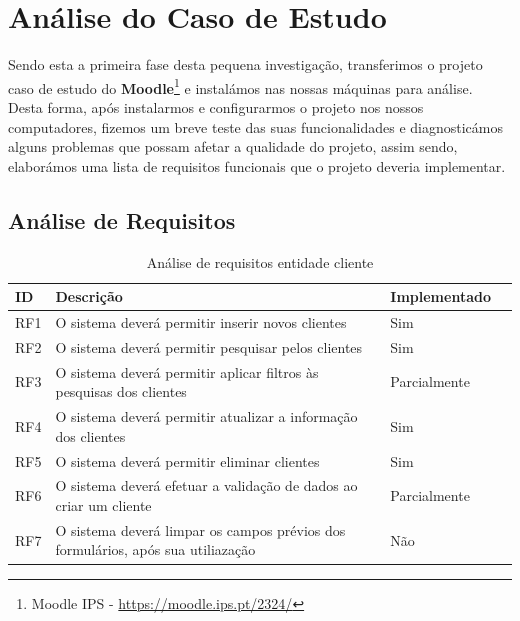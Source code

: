 \documentclass[a4paper,12pt]{article} %
\begin{document}
\newpage
\section{Análise do Caso de Estudo}
Sendo esta a primeira fase desta pequena investigação, transferimos o projeto caso de estudo do \textbf{Moodle}\footnote{Moodle IPS - \url{https://moodle.ips.pt/2324/}} e instalámos nas nossas máquinas para análise. Desta forma, após instalarmos e configurarmos o projeto nos nossos computadores, fizemos um breve teste das suas funcionalidades e diagnosticámos alguns problemas que possam afetar a qualidade do projeto, assim sendo, elaborámos uma lista de requisitos funcionais que o projeto deveria implementar.

\subsection{Análise de Requisitos}
\begin{table}[H]
	\centering
	\begin{tabular}{|l|p{12cm}|l|r|}
		\hline
		\textbf{ID} & \textbf{Descrição} & \textbf{Implementado}\\
		\hline
		RF1 & O sistema deverá permitir inserir novos clientes & Sim \\
		\hline
		RF2 & O sistema deverá permitir pesquisar pelos clientes & Sim \\
		\hline
		RF3 & O sistema deverá permitir aplicar filtros às pesquisas dos clientes & Parcialmente\footnotemark \\
		\hline
		RF4 & O sistema deverá permitir atualizar a informação dos clientes & Sim \\
		\hline
		RF5 & O sistema deverá permitir eliminar clientes & Sim \\
		\hline
		RF6 & O sistema deverá efetuar a validação de dados ao criar um cliente & Parcialmente\footnotemark \\
		\hline
		RF7 & O sistema deverá limpar os campos prévios dos formulários, após sua utiliazação & Não \\
		\hline
	\end{tabular}
	\caption{Análise de requisitos entidade cliente}
\end{table}
\end{document}
